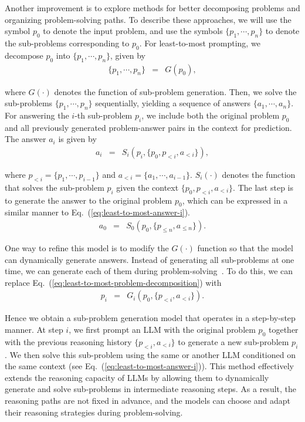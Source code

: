 Another improvement is to explore methods for better decomposing problems and organizing problem-solving paths. To describe these approaches, we will use the symbol $p_0$ to denote the input problem, and use the symbols $\{p_1,\cdots,p_n \}$ to denote the sub-problems corresponding to $p_0$. For least-to-most prompting, we decompose $p_0$ into $\{p_1,\cdots,p_n \}$, given by
\begin{eqnarray}
\{p_1,\cdots,p_n \} & = & G(p_0), \label{eq:least-to-most-problem-decomposition}
\end{eqnarray}

\noindent where $G(\cdot)$ denotes the function of sub-problem generation. Then, we solve the sub-problems $\{p_1,\cdots,p_n\}$ sequentially, yielding a sequence of answers $\{a_1,\cdots,a_n\}$. For answering the $i$-th sub-problem $p_i$, we include both the original problem $p_0$ and all previously generated problem-answer pairs in the context for prediction. The answer $a_i$ is given by
\begin{eqnarray}
a_i & = & S_i(p_i,\{p_0,p_{<i},a_{<i}\}), \label{eq:least-to-most-answer-i}
\end{eqnarray}

\noindent where $p_{<i}=\{p_1,\cdots,p_{i-1}\}$ and $a_{<i}=\{a_1,\cdots,a_{i-1}\}$. $S_i(\cdot)$ denotes the function that solves the sub-problem $p_i$ given the context $\{p_0,p_{<i},a_{<i}\}$. The last step is to generate the answer to the original problem $p_0$, which can be expressed in a similar manner to Eq.~(\ref{eq:least-to-most-answer-i}).
\begin{eqnarray}
a_0 & = & S_0(p_0,\{p_{\le n},a_{\le n}\}).
\end{eqnarray}

One way to refine this model is to modify the $G(\cdot)$ function so that the model can dynamically generate answers. Instead of generating all sub-problems at one time, we can generate each of them during problem-solving~\cite{dua-etal:2022successive}. To do this, we can replace Eq.~(\ref{eq:least-to-most-problem-decomposition}) with
\begin{eqnarray}
p_i & = & G_i(p_0,\{p_{<i},a_{<i}\}).
\end{eqnarray}

\noindent Hence we obtain a sub-problem generation model that operates in a step-by-step manner. At step $i$, we first prompt an LLM with the original problem $p_0$ together with the previous reasoning history $\{p_{<i},a_{<i}\}$ to generate a new sub-problem $p_i$. We then solve this sub-problem using the same or another LLM conditioned on the same context (see Eq.~(\ref{eq:least-to-most-answer-i})). This method effectively extends the reasoning capacity of LLMs by allowing them to dynamically generate and solve sub-problems in intermediate reasoning steps. As a result, the reasoning paths are not fixed in advance, and the models can choose and adapt their reasoning strategies during problem-solving.

